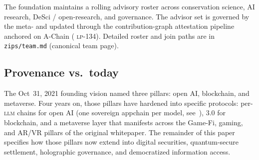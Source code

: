 The foundation maintains a rolling advisory roster across conservation
science, AI research, DeSci / open-research, and governance.
The advisor set is governed by the meta-\DAO{} and updated through the
contribution-graph attestation pipeline anchored on \Lux{} A-Chain
(\Lux{} \textsc{lp-134}). Detailed roster and join paths are in
\texttt{zips/team.md} (canonical team page).

\subsection{Provenance vs.\ today}

The Oct~31, 2021 founding vision named three pillars: open AI,
blockchain, and metaverse. Four years on, those pillars have hardened
into specific protocols: per-\textsc{llm} chains for open AI (one
sovereign \Quasar{} appchain per model, see~\cite{zoo-per-llm-chains}),
\Lux{} \Quasar{} 3.0 for blockchain, and a metaverse layer that
manifests across the Game-Fi, gaming, and AR/VR pillars of the original
whitepaper. The remainder of this paper specifies how those pillars now
extend into digital securities, quantum-secure settlement, holographic
governance, and democratized information access.

